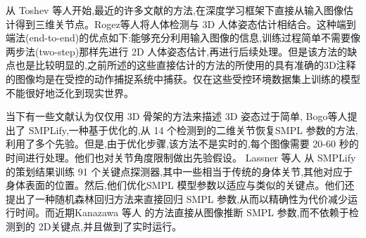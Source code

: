 \begin{refsection}
从 Toshev \cite{toshev2014deep}等人开始,最近的许多文献的方法,在深度学习框架下直接从输入图像估计得到三维关节点\cite{pavlakos2017coarse}\cite{tekin2017learning}\cite{tome2017lifting}\cite{zhou2017weaklysupervised}。Rogez\cite{rogez2016mocap}等人将人体检测与 3D 人体姿态估计相结合。这种端到端法(end-to-end)的优点如下:能够充分利用输入图像的信息,训练过程简单不需要像两步法(two-step)那样先进行 2D 人体姿态估计,再进行后续处理。但是该方法的缺点也是比较明显的,之前所述的这些直接估计的方法的所使用的具有准确的3D注释的图像均是在受控的动作捕捉系统中捕获。仅在这些受控环境数据集上训练的模型不能很好地泛化到现实世界。

当下有一些文献认为仅仅用 3D 骨架的方法来描述 3D 姿态过于简单, Bogo等人\cite{bogo2016keep}提出了 SMPLify,一种基于优化的,从 14 个检测到的二维关节恢复SMPL 参数的方法,利用了多个先验。但是,由于优化步骤,该方法不是实时的,每个图像需要 20-60 秒的时间进行处理。他们也对关节角度限制做出先验假设。 Lassner \cite{lassner2017unite} 等人 从 SMPLify 的策划结果训练 91 个关键点探测器,其中一些相当于传统的身体关节,其他对应于身体表面的位置。然后,他们优化SMPL 模型参数以适应与\cite{bogo2016keep}类似的关键点。他们还提出了一种随机森林回归方法来直接回归 SMPL 参数,从而以精确性为代价减少运行时间。而近期Kanazawa 等人\cite{kanazawa2018end} 的方法直接从图像推断 SMPL 参数,而不依赖于检测到的 2D关键点,并且做到了实时运行。


\newpage
\printbibliography
\end{refsection}
